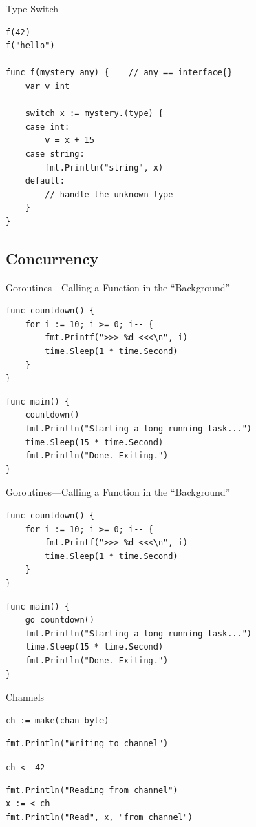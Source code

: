\documentclass[pdf]{beamer}
\newcommand\z[1]{\texttt{#1}}
\newcommand\identifier[1]{{\color{green!70!black}\z{#1}}}
\begin{document}
\begin{frame}[fragile]{Type Switch}
\begin{lstlisting}
f(42)
f("hello")

func f(mystery any) {    // any == interface{}
    var v int
    
    switch x := mystery.(type) {
    case int:
        v = x + 15
    case string:
        fmt.Println("string", x)
    default:
        // handle the unknown type
    }
}
\end{lstlisting}
\end{frame}

\subsection{Concurrency}
\begin{frame}[fragile]{Goroutines---Calling a Function in the ``Background''}
\begin{lstlisting}
func countdown() {
    for i := 10; i >= 0; i-- {
        fmt.Printf(">>> %d <<<\n", i)
        time.Sleep(1 * time.Second)
    }
}
\end{lstlisting}
\pause
\begin{lstlisting}
func main() {
    countdown()
    fmt.Println("Starting a long-running task...")
    time.Sleep(15 * time.Second)
    fmt.Println("Done. Exiting.")
}
\end{lstlisting}
\end{frame}

\begin{frame}[fragile]{Goroutines---Calling a Function in the ``Background''}
\begin{lstlisting}
func countdown() {
    for i := 10; i >= 0; i-- {
        fmt.Printf(">>> %d <<<\n", i)
        time.Sleep(1 * time.Second)
    }
}
\end{lstlisting}
\begin{lstlisting}
func main() {
    go countdown()
    fmt.Println("Starting a long-running task...")
    time.Sleep(15 * time.Second)
    fmt.Println("Done. Exiting.")
}
\end{lstlisting}
\end{frame}


\begin{frame}[fragile]{Channels}
\begin{lstlisting}
ch := make(chan byte)
\end{lstlisting}
\pause
\begin{lstlisting}
fmt.Println("Writing to channel")
\end{lstlisting}
\identifier{ch}\z{ <- 42}
\pause
\begin{lstlisting}
fmt.Println("Reading from channel")
x := <-ch
fmt.Println("Read", x, "from channel")
\end{lstlisting}
\end{frame}
\end{document}
